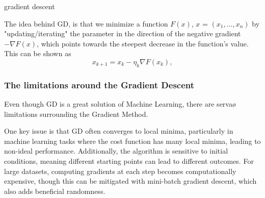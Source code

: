 gradient descent

The idea behind GD, is that we minimize a function \(F(x)\), \(x\) = \((x_1, \dots, x_n)\) by "updating/iterating" the parameter in the direction of the negative gradient \( -\nabla F(x) \), which points towards the steepest decrease in the function's value.
This can be shown as 
\begin{equation}
    x_{k+1} = x_k - \eta_k \nabla F(x_k), 
\end{equation}



   




\subsubsection{The limitations around the Gradient Descent}
Even though GD is a great solution of Machine Learning, there are servaø limitations surrounding the Gradient Method. 

One key issue is that GD often converges to local minima, particularly in machine learning tasks where the cost function has many local minima, leading to non-ideal performance. Additionally, the algorithm is sensitive to initial conditions, meaning different starting points can lead to different outcomes. For large datasets, computing gradients at each step becomes computationally expensive, though this can be mitigated with mini-batch gradient descent, which also adds beneficial randomness. 

